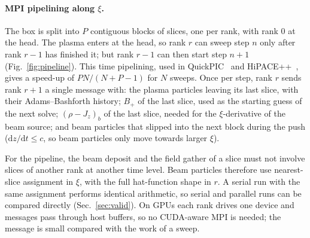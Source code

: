 \documentclass[aps,prab,reprint,floatfix,superscriptaddress,amsmath,amssymb]{revtex4-2}
\newcommand{\dd}{\mathrm{d}}
\begin{document}
\paragraph{MPI pipelining along $\xi$.} The box is split into $P$ contiguous blocks of slices, one per rank, with rank 0 at the head. The plasma enters at the head, so rank $r$ can sweep step $n$ only after rank $r-1$ has finished it; but rank $r-1$ can then start step $n+1$ (Fig.~\ref{fig:pipeline}). This time pipelining, used in QuickPIC~\cite{Feng2009} and HiPACE++~\cite{Diederichs2022}, gives a speed-up of $PN/(N+P-1)$ for $N$ sweeps. Once per step, rank $r$ sends rank $r+1$ a single message with: the plasma particles leaving its last slice, with their Adams--Bashforth history; $B_+$ of the last slice, used as the starting guess of the next solve; $(\rho - J_z)_b$ of the last slice, needed for the $\xi$-derivative of the beam source; and beam particles that slipped into the next block during the push ($\dd z/\dd t\le c$, so beam particles only move towards larger $\xi$).

For the pipeline, the beam deposit and the field gather of a slice must not involve slices of another rank at another time level. Beam particles therefore use nearest-slice assignment in $\xi$, with the full hat-function shape in $r$. A serial run with the same assignment performs identical arithmetic, so serial and parallel runs can be compared directly (Sec.~\ref{sec:valid}). On GPUs each rank drives one device and messages pass through host buffers, so no CUDA-aware MPI is needed; the message is small compared with the work of a sweep.
\end{document}
